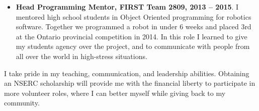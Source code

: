 \documentclass[a4paper,12pt]{article}
\begin{document}
\begin{itemize}
\item \textbf{Head Programming Mentor, FIRST Team 2809, 2013 -- 2015}. 
    I mentored high school students in Object Oriented programming for robotics
    software. Together we programmed a robot in under 6 weeks and placed 3rd at
    the Ontario provincial competition in 2014.
    In this role I learned to give my students agency over the project, and to
    communicate with people from all over the world in high-stress situations.

\end{itemize}

I take pride in my teaching, communication, and leadership abilities.
Obtaining an NSERC scholarship will provide me with the financial liberty to
participate in more volunteer roles, where I can better myself while giving back to my
community.
\end{document}
